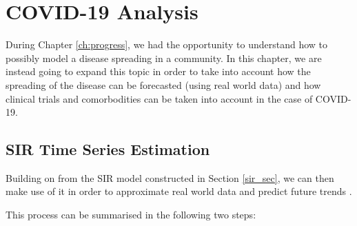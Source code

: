 \chapter{COVID-19 Analysis}
\setcounter{secnumdepth}{5}
\label{ch:AI}
\setlength\lineskip{0pt}
\vspace*{15pt}

 
 
\lstset{style=mystyle}

During Chapter \ref{ch:progress}, we had the opportunity to understand how to possibly model a disease spreading in a community. In this chapter, we are instead going to expand this topic in order to take into account how the spreading of the disease can be forecasted (using real world data) and how clinical trials and comorbodities can be taken into account in the case of COVID-19.

\section{SIR Time Series Estimation}
Building on from the SIR model constructed in Section \ref{sir_sec}, we can then make use of it in order to approximate real world data and predict future trends \cite{atom}.

This process can be summarised in the following two steps:

